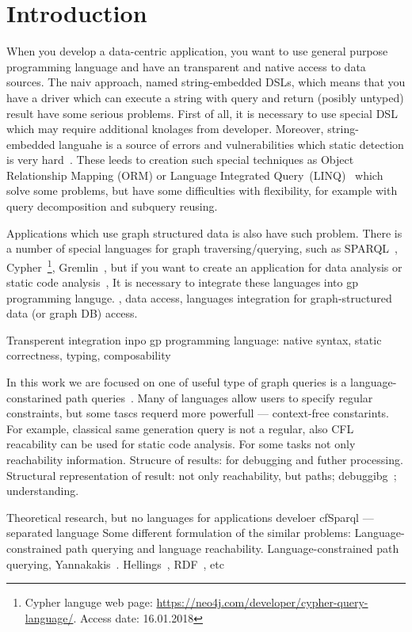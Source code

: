 \section{Introduction}

When you develop a data-centric application, you want to use general purpose programming language and have an transparent and native access to data sources.
The naiv approach, named string-embedded DSLs, which means that you have a driver which can execute a string with query and return (posibly untyped) result have some serious problems.
First of all, it is necessary to use special DSL which may require additional knolages from developer.
Moreover, string-embedded languahe is a source of errors and vulnerabilities which static detection is very hard~\cite{stringEmbeddedLanguagesProblem}.  
These leeds to creation such special techniques as Object Relationship Mapping (ORM) or Language Integrated Query~(LINQ)~\cite{LINQ1, LINQ2} which solve some problems, but have some difficulties with flexibility, for example with query decomposition and subquery reusing.


Applications which use graph structured data is also have such problem. 
There is a number of special languages for graph traversing/querying,
 such as SPARQL~\cite{sparql}, Cypher~\footnote{Cypher languge web page: \url{https://neo4j.com/developer/cypher-query-language/}. Access date: 16.01.2018}, Gremlin~\cite{gremlin},
 but if you want to create an application for data analysis or static code analysis~\cite{!!!}, 
It is necessary to integrate these languages into gp programming languge.
, data access, languages integration for graph-structured data (or graph DB) access.

Transperent integration inpo gp programming language: native syntax, static correctness, typing, composability


In this work we are focused on one of useful type of graph queries is a language-constarined path queries~\cite{FLCpathProblem}.
Many of languages allow users to specify regular constraints, but some tascs requerd more powerfull --- context-free constarints.
For example, classical same generation query is not a regular, also CFL reacability can be used for static code analysis.
For some tasks not only reachability information. Strucure of results: for debugging and futher processing.
Structural representation of result: not only reachability, but paths; debuggibg~\cite{structForDebugging}; understanding.

Theoretical research, but no languages for applications develoer
cfSparql --- separated language
Some different formulation of the similar problems: Language-constrained path querying and language reachability.
Language-constrained path querying, Yannakakis~\cite{Yannakakis}. 
Hellings~\cite{ConjCFPathQuery, Hellings16}, RDF~\cite{CFGonRDF}, etc~\cite{QueryGraphWithData, RegularDBQuery, GraphQueryWithEarley, FLCpathProblem, graphDB}

